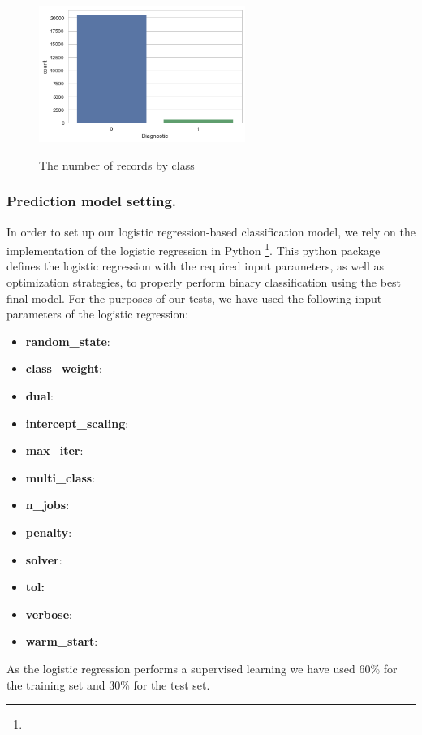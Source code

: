 \begin{figure}[h]
\centering
\includegraphics[width=0.6\textwidth]{images/imbalanced_dataset}
\label{records_class}\caption{The number of records by class}
\end{figure} 

\subsubsection{Prediction model setting.}
In order to set up our logistic regression-based classification model, we rely on the implementation of the logistic regression in Python \footnote{}.
This python package defines the logistic regression with the required input parameters, as well as optimization strategies, to properly perform binary 
classification using the best final model. For the purposes of our tests, we have used the following input parameters of the logistic regression:

\begin{itemize}
\item \textbf{random\_state}:
\item \textbf{class\_weight}:
\item \textbf{dual}:
\item \textbf{intercept\_scaling}:
\item \textbf{max\_iter}:
\item \textbf{multi\_class}:
\item \textbf{n\_jobs}:
\item \textbf{penalty}:
\item \textbf{solver}:
\item \textbf{tol:}
\item \textbf{verbose}:
\item \textbf{warm\_start}:
\end{itemize}

As the logistic regression performs a supervised learning we have used 60\% for the training set and 30\% for the test set.

